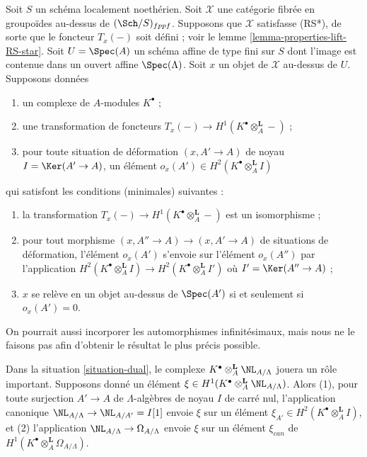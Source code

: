 \begin{situation}
\label{situation-dual}
Soit $S$ un schéma localement noethérien. Soit $\mathcal{X}$ une catégorie
fibrée en groupoïdes au-dessus de $(\Sch/S)_{fppf}$. Supposons que
$\mathcal{X}$ satisfasse (RS*), de sorte que le foncteur $T_x(-)$ soit défini ; voir le
lemme \ref{lemma-properties-lift-RS-star}.
Soit $U = \Spec(A)$ un schéma affine de type fini sur $S$ dont l'image
est contenue dans un ouvert affine $\Spec(\Lambda)$. Soit $x$ un objet de $\mathcal{X}$
au-dessus de $U$. Supposons données
\begin{enumerate}
\item un complexe de $A$-modules $K^\bullet$ ;
\item une transformation de foncteurs
$T_x(-) \to H^1(K^\bullet \otimes_A^\mathbf{L} -)$ ;
\item pour toute situation de déformation $(x, A' \to A)$ de noyau
$I = \Ker(A' \to A)$, un élément
$o_x(A') \in H^2(K^\bullet \otimes_A^\mathbf{L} I)$
\end{enumerate}
qui satisfont les conditions (minimales) suivantes :
\begin{enumerate}
\item[(i)] la transformation
$T_x(-) \to H^1(K^\bullet \otimes_A^\mathbf{L} -)$
est un isomorphisme ;
\item[(ii)] pour tout morphisme $(x, A'' \to A) \to (x, A' \to A)$ de situations
de déformation, l'élément $o_x(A')$ s'envoie sur l'élément $o_x(A'')$
par l'application
$H^2(K^\bullet \otimes_A^\mathbf{L} I) \to
H^2(K^\bullet \otimes_A^\mathbf{L} I')$
où $I' = \Ker(A'' \to A)$ ;
\item[(iii)] $x$ se relève en un objet au-dessus de $\Spec(A')$ si et seulement si
$o_x(A') = 0$.
\end{enumerate}
On pourrait aussi incorporer les automorphismes infinitésimaux, mais
nous ne le faisons pas afin d'obtenir le résultat le plus précis possible.
\end{situation}

\noindent
Dans la situation \ref{situation-dual}, le complexe
$K^\bullet \otimes_A^\mathbf{L} \NL_{A/\Lambda}$ jouera un rôle important. Supposons donné un
élément $\xi \in H^1(K^\bullet \otimes_A^\mathbf{L} \NL_{A/\Lambda})$.
Alors (1), pour toute surjection $A' \to A$ de $\Lambda$-algèbres de noyau
$I$ de carré nul, l'application canonique $\NL_{A/\Lambda} \to \NL_{A/A'} = I[1]$
envoie $\xi$ sur un élément $\xi_{A'} \in H^2(K^\bullet \otimes_A^\mathbf{L} I)$,
et (2) l'application $\NL_{A/\Lambda} \to \Omega_{A/\Lambda}$ envoie
$\xi$ sur un élément $\xi_{can}$ de
$H^1(K^\bullet \otimes_A^\mathbf{L} \Omega_{A/\Lambda})$.

